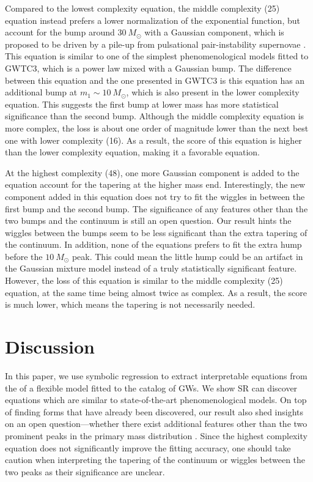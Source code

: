 \documentclass[nohyperref]{article}
\theoremstyle{plain}
\theoremstyle{definition}
\theoremstyle{remark}
\begin{document}
Compared to the lowest complexity equation, the middle complexity (25) equation instead prefers a lower normalization of the exponential function,
but account for the bump around $30\ M_{\odot}$ with a Gaussian component,
which is proposed to be driven by a pile-up from pulsational pair-instability supernovae \cite{Talbot:2018cva}.
This equation is similar to one of the simplest phenomenological models fitted to GWTC3, which is a power law mixed with a Gaussian bump.
The difference between this equation and the one presented in GWTC3 is this equation has an additional bump at $m_{1}\sim 10\ M_{\odot}$,
which is also present in the lower complexity equation.
This suggests the first bump at lower mass has more statistical significance than the second bump.
Although the middle complexity equation is more complex, the loss is about one order of magnitude lower than the next best one with lower complexity (16).
As a result, the score of this equation is higher than the lower complexity equation, making it a favorable equation.

At the highest complexity (48), one more Gaussian component is added to the equation account for the tapering at the higher mass end. 
Interestingly, the new component added in this equation does not try to fit the wiggles in between the first bump and the second bump.
The significance of any features other than the two bumps and the continuum is still an open question.
Our result hints the wiggles between the bumps seem to be less significant than the extra tapering of the continuum.
In addition, none of the equations prefers to fit the extra hump before the $10\ M_{\odot}$ peak.
This could mean the little hump could be an artifact in the Gaussian mixture model instead of a truly statistically significant feature.
However, the loss of this equation is similar to the middle complexity (25) equation, at the same time being almost twice as complex. As a result, the score is much lower, which means the tapering is not necessarily needed.

\section{Discussion}
\label{sec:discussion}

In this paper, we use symbolic regression to extract interpretable equations from the \ppd of a flexible model fitted to the catalog of GWs.
We show SR can discover equations which are similar to state-of-the-art phenomenological models.
On top of finding forms that have already been discovered,
our result also shed insights on an open question---whether there exist additional features other than the two prominent peaks in the primary mass distribution \cite{Tiwari:2021yvr}.
Since the highest complexity equation does not significantly improve the fitting accuracy, one should take caution when interpreting the tapering of the continuum or wiggles between the two peaks as their significance are unclear.
\end{document}
